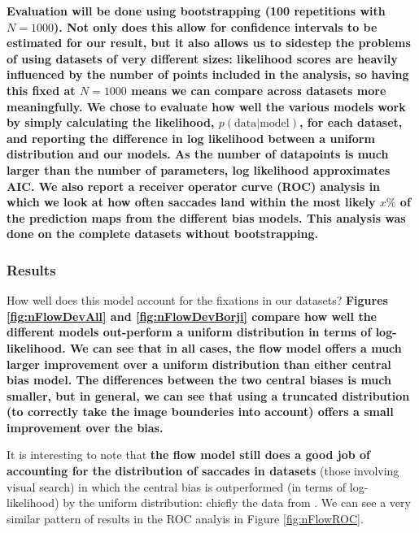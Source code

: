 \documentclass[a4paper, twocolumn, oneside, 11pt]{article}
\begin{document}
\textbf{Evaluation will be done using bootstrapping (100 repetitions with $N=1000$). Not only does  this allow for confidence intervals to be estimated for our result, but it also allows us to sidestep the problems of using datasets of very different sizes: likelihood scores are heavily influenced by the number of points included in the analysis, so having this fixed at $N=1000$ means we can compare across datasets more meaningfully. We chose to evaluate how well the various models work by simply calculating the likelihood, $p(\text{data}|\text{model})$, for each dataset, and reporting the difference in log likelihood between a uniform distribution and our models. As the number of datapoints is much larger than the number of parameters, log likelihood approximates AIC. We also report a receiver operator curve (ROC) \citep{green-swets1966} analysis in which we look at how often saccades land within the most likely $x\%$ of the prediction maps from the different bias models. This analysis was done on the complete datasets without bootstrapping.}

\subsubsection{Results}

How well does this model account for the fixations in our datasets? \textbf{Figures \ref{fig:nFlowDevAll} and \ref{fig:nFlowDevBorji} compare how well the different models out-perform a uniform distribution in terms of log-likelihood. We can see that in all cases, the flow model offers a much larger improvement over a uniform distribution than either central bias model. The differences between the two central biases is much smaller, but in general, we can see that using a truncated distribution (to correctly take the image bounderies into account) offers a small improvement over the \cite{clarke-tatler2014} bias.} 

It is interesting to note that \textbf{the flow model still does a good job of accounting for the distribution of saccades in datasets} (those involving visual search) in which the central bias is outperformed (in terms of log-likelihood) by the uniform distribution: chiefly the data from \cite{clarke2009,asher2013,tatler2007}. We can see a very similar pattern of results in the ROC analyis in Figure \ref{fig:nFlowROC}.
\end{document}
